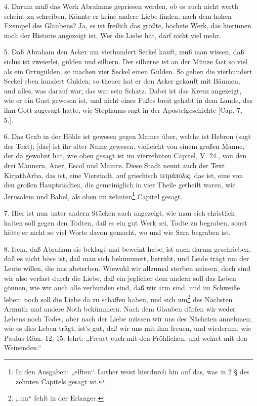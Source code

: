4. Darum muß das Werk Abrahams gepriesen werden, ob es auch nicht werth scheint zu schreiben. Könnte er keine andere Liebe finden, nach dem hohen Exempel des Glaubens? Ja, es ist freilich das größte, höchste Werk, das hierinnen nach der Historie angezeigt ist. Wer die Liebe hat, darf nicht viel mehr.

5. Daß Abraham den Acker um vierhundert Seckel kauft, muß man wissen, daß siclus ist zweierlei, gülden und silbern. Der silberne ist an der Münze fast so viel als ein Ortugulden, so machen vier Seckel einen Gulden. So geben die vierhundert Seckel eben hundert Gulden; so theuer hat er den Acker gekauft mit Bäumen, und alles, was darauf war; das war sein Schatz. Dabei ist das Kreuz angezeigt, wie er ein Gast gewesen ist, und nicht eines Fußes breit gehabt in dem Lande, das ihm Gott zugesagt hatte, wie Stephanus sagt in der Apostelgeschichte [Cap. 7, 5.].

6. Das Grab in der Höhle ist gewesen gegen Mamre über, welche ist Hebron (sagt der Text); [das] ist ihr alter Name gewesen, vielleicht von einem großen Manne, der da gewohnt hat, wie oben gesagt ist im vierzehnten Capitel, V. 24., von den drei Männern, Aner, Escol und Mamre. Diese Stadt nennt auch der Text KirjathArba, das ist, eine Vierstadt, auf griechisch τετράπολις, das ist, eine von den großen Hauptstädten, die gemeiniglich in vier Theile getheilt waren, wie Jerusalem und Babel, als oben im zehnten\footnote{In den Ausgaben: „elften“. Luther weist hierdurch hin auf das, was in 2 § des zehnten Capitels gesagt ist.} Capitel gesagt.

7. Hier ist nun unter andern Stücken auch angezeigt, wie man sich christlich halten soll gegen den Todten, daß es ein gut Werk sei, Todte zu begraben, sonst hätte er nicht so viel Worte davon gemacht, wo und wie Sara begraben ist.

8. Item, daß Abraham sie beklagt und beweint habe, ist auch darum geschrieben, daß es nicht böse ist, daß man sich bekümmert, betrübt, und Leide trägt um der Leute willen, die uns absterben. Wiewohl wir allzumal sterben müssen, doch sind wir also verfast durch die Liebe, daß ein jeglicher dem andern soll das Leben gönnen, wie wir auch alle verbunden sind, daß wir arm sind, und im Schweiße leben: noch soll die Liebe da zu schaffen haben, und sich um\footnote{„um“ fehlt in der Erlanger.} des Nächsten Armuth und andere Noth bekümmern. Nach dem Glauben dürfen wir weder Lebens noch Todes, aber nach der Liebe müssen wir uns des Nächsten annehmen; wie es dies Leben trägt,
ist’s gut, daß wir uns mit ihm freuen, und wiederum, wie Paulus Röm. 12, 15. lehrt: „Freuet euch mit den Fröhlichen, und weinet mit den Weinenden.“

